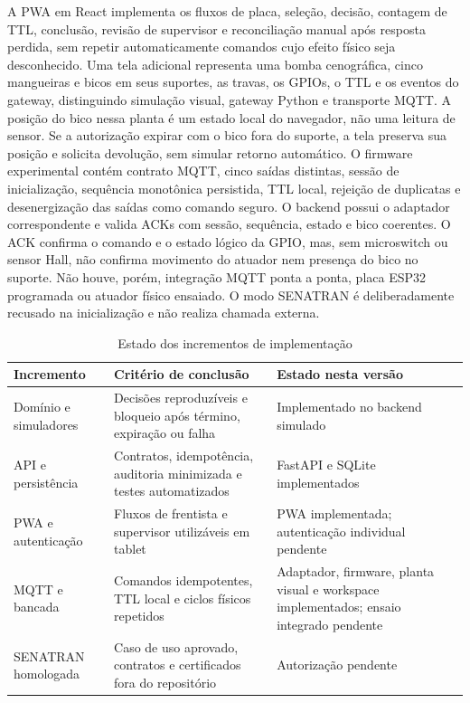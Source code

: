 A PWA em React implementa os fluxos de placa, seleção, decisão, contagem de TTL,
conclusão, revisão de supervisor e reconciliação manual após resposta perdida,
sem repetir automaticamente comandos cujo efeito físico seja desconhecido. Uma
tela adicional representa uma bomba cenográfica, cinco mangueiras e bicos em
seus suportes, as travas, os GPIOs, o TTL e os eventos do gateway, distinguindo
simulação visual, gateway Python e transporte MQTT. A posição do bico nessa
planta é um estado local do navegador, não uma leitura de sensor. Se a
autorização expirar com o bico fora do suporte, a tela preserva sua posição e
solicita devolução, sem simular retorno automático. O
firmware experimental contém contrato MQTT,
cinco saídas distintas, sessão de inicialização, sequência monotônica persistida,
TTL local, rejeição de duplicatas e desenergização das saídas como comando
seguro.
O backend possui o adaptador correspondente e valida ACKs com sessão, sequência,
estado e bico coerentes. O ACK confirma o comando e o estado lógico da GPIO,
mas, sem microswitch ou sensor Hall, não confirma movimento do atuador nem
presença do bico no suporte. Não houve, porém, integração MQTT ponta a ponta, placa
ESP32 programada ou atuador físico ensaiado.
O modo SENATRAN é deliberadamente recusado na inicialização e não realiza
chamada externa.

\begingroup
\renewcommand{\arraystretch}{1.04}
\begin{table}[H]
  \centering
  \caption{Estado dos incrementos de implementação}
  \label{tab:implementacao-status}
  \footnotesize
  \begin{tabularx}{\textwidth}{@{}L{2.8cm}YL{3.2cm}@{}}
    \toprule
    \textbf{Incremento} & \textbf{Critério de conclusão} & \textbf{Estado nesta versão} \\
    \midrule
    Domínio e simuladores & Decisões reproduzíveis e bloqueio após término, expiração ou falha & Implementado no backend simulado \\
    API e persistência & Contratos, idempotência, auditoria minimizada e testes automatizados & FastAPI e SQLite implementados \\
    PWA e autenticação & Fluxos de frentista e supervisor utilizáveis em tablet & PWA implementada; autenticação individual pendente \\
    MQTT e bancada & Comandos idempotentes, TTL local e ciclos físicos repetidos & Adaptador, firmware, planta visual e workspace implementados; ensaio integrado pendente \\
    SENATRAN homologada & Caso de uso aprovado, contratos e certificados fora do repositório & Autorização pendente \\
    \bottomrule
  \end{tabularx}
  \\[2pt]\fontepropria
\end{table}
\endgroup

